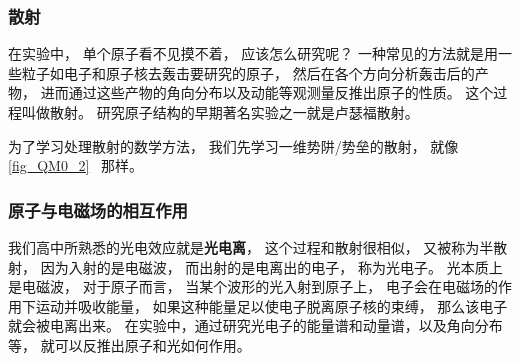 \subsubsection{散射}
在实验中， 单个原子看不见摸不着， 应该怎么研究呢？ 一种常见的方法就是用一些粒子如电子和原子核去轰击要研究的原子， 然后在各个方向分析轰击后的产物， 进而通过这些产物的角向分布以及动能等观测量反推出原子的性质。 这个过程叫做散射。 研究原子结构的早期著名实验之一就是卢瑟福散射。

为了学习处理散射的数学方法， 我们先学习一维势阱/势垒的散射， 就像\autoref{fig_QM0_2}~ 那样。

\subsubsection{原子与电磁场的相互作用}
我们高中所熟悉的光电效应就是\textbf{光电离}， 这个过程和散射很相似， 又被称为半散射， 因为入射的是电磁波， 而出射的是电离出的电子， 称为光电子。 光本质上是电磁波， 对于原子而言， 当某个波形的光入射到原子上， 电子会在电磁场的作用下运动并吸收能量， 如果这种能量足以使电子脱离原子核的束缚， 那么该电子就会被电离出来。 在实验中，通过研究光电子的能量谱和动量谱，以及角向分布等， 就可以反推出原子和光如何作用。
